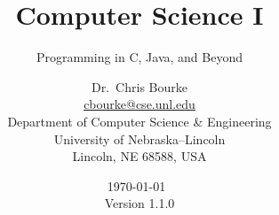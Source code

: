 
\usepackage[boxed,slide,linesnumbered,algochapter]{algorithm2e}
\DontPrintSemicolon
{} %
\IncMargin{5em}
\SetAlCapSkip{1em}
\setlength{\algomargin}{2em} %
\SetVlineSkip{0em}

\usepackage[yyyymmdd,hhmmss]{datetime}

\theoremstyle{definition}
\newtheorem{exer}{Exercise}

\newcommand{\Neg}{\ensuremath{\neg}}
\renewcommand{\And}{\ensuremath{\mathbin{\textsc{And}}}}
\newcommand{\Or}{\ensuremath{\mathbin{\textsc{Or}}}}
\newcommand{\True}{\emph{true}\xspace}
\newcommand{\False}{\emph{false}\xspace}
\newcommand{\Null}{\textsc{Null}}

\title{Computer Science I}
\subtitle{Programming in C, Java, and Beyond}
\author{Dr.\ Chris Bourke\\
        \href{mailto:cbourke@cse.unl.edu}{cbourke@cse.unl.edu} \\
        Department of Computer Science \& Engineering\\
        University of Nebraska--Lincoln\\
        Lincoln, NE 68588, USA
}

\date{\today\  \currenttime \\ Version 1.1.0}

